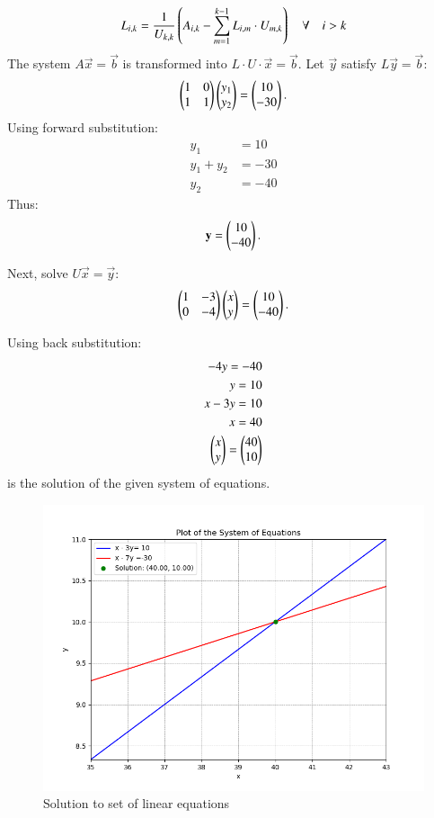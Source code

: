 \documentclass[journal,12pt,onecolumn]{IEEEtran}
\theoremstyle{remark}
\begin{document}
\begin{align}
L_{i,k} = \frac{1}{U_{k,k}} \left( A_{i,k} - \sum_{m=1}^{k-1} L_{i,m} \cdot U_{m,k}\right) \quad \forall \quad i > k
\end{align}
The system $A\vec{x} = \vec{b}$ is transformed into $L \cdot U \cdot \vec{x} = \vec{b}$. Let $\vec{y}$ satisfy $L\vec{y} = \vec{b}$:
\begin{align}
    \begin{pmatrix}1 & 0 \\ 1 & 1\end{pmatrix} \begin{pmatrix}y_1 \\ y_2\end{pmatrix} = \begin{pmatrix}10\\ -30\end{pmatrix}.
\end{align}
Using forward substitution:
\begin{align}
    y_1 &= 10 \\
    y_1 + y_2 &= -30\\
    y_2 &= -40
\end{align}
Thus:
\begin{align}
    \mathbf{y} = \begin{pmatrix}10 \\ -40\end{pmatrix}.
\end{align}

Next, solve $U\vec{x} = \vec{y}$:
\begin{align}
    \begin{pmatrix}1 & -3 \\ 0 & -4\end{pmatrix} \begin{pmatrix}x \\ y\end{pmatrix} = \begin{pmatrix}10\\ -40\end{pmatrix}.
\end{align}

Using back substitution:
\begin{align}
	-4y=-40\\
    y=10\\
    x-3y=10\\
    x=40\\
    \begin{pmatrix}x \\ y\end{pmatrix}= \begin{pmatrix}40 \\ 10\end{pmatrix}
\end{align}
is the solution of the given system of equations.
\begin{figure}[h!]
   \centering
   \includegraphics[width=1\columnwidth]{figs/Q6.png}
    \caption{Solution to set of linear equations}
\end{figure}
\end{document}
